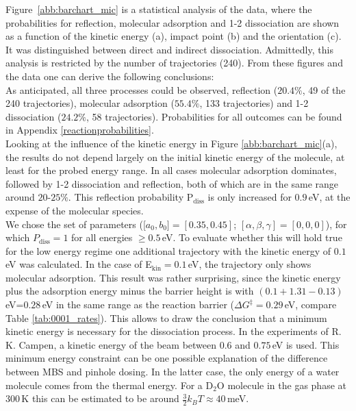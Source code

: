 \documentclass[11pt,DIV=13,BCOR=5mm,a4paper,headinclude]{scrbook}
\begin{document}
Figure~\ref{abb:barchart_mic} is a statistical analysis of the data, where the probabilities for reflection, molecular adsorption and 1-2 dissociation are shown as a function of the kinetic energy (a), impact point (b) and the orientation (c).
It was distinguished between direct and indirect dissociation.
Admittedly, this analysis is restricted by the number of trajectories (240).
From these figures and the data one can derive the following conclusions:
\\
As anticipated, all three processes could be observed, reflection ($20.4\%$, 49 of the 240 trajectories), molecular adsorption ($55.4\%$, 133 trajectories) and 1-2 dissociation ($24.2\%$, 58 trajectories).
Probabilities for all outcomes can be found in Appendix \ref{reactionprobabilities}.
\\
Looking at the influence of the kinetic energy in Figure \ref{abb:barchart_mic}(a), the results do not depend largely on the initial kinetic energy of the molecule, at least for the probed energy range.
In all cases molecular adsorption dominates, followed by 1-2 dissociation and reflection, both of which are in the same range around $20$-$25\%$.
This reflection probability P$_\textrm{diss}$ is only increased for $0.9\,$eV, at the expense of the molecular species.\\
We chose the set of parameters ([$a_0,b_0]=[0.35,0.45]$; $[\alpha,\beta,\gamma]=[0,0,0]$), for which $P_\textrm{diss}=1$ for all energies $\geq 0.5\,$eV.
To evaluate whether this will hold true for the low energy regime one additional trajectory with the kinetic energy of $0.1\,$eV was calculated.
In the case of E$_\textrm{kin}=0.1\,$eV, the trajectory only shows molecular adsorption.
This result was rather surprising, since the kinetic energy plus the adsorption energy minus the barrier height is with $(0.1+1.31-0.13)\,$eV=$0.28\,$eV in the same range as the reaction barrier ($\Delta G^\ddagger=0.29\,$eV, compare Table \ref{tab:0001_rates}).
This allows to draw the conclusion that a minimum kinetic energy is necessary for the dissociation process.
In the experiments of R. K. Campen, a kinetic energy of the beam between $0.6$ and $0.75\,$eV is used.
This minimum energy constraint can be one possible explanation of the difference between MBS and pinhole dosing.
In the latter case, the only energy of a water molecule comes from the thermal energy.
For a D$_2$O molecule in the gas phase at $300\,$K this can be estimated to be around $\frac{3}{2}k_BT\approx40\,$meV.
\end{document}
